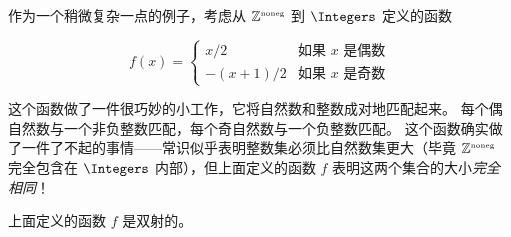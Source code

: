 作为一个稍微复杂一点的例子，考虑从 ${\mathbb Z}^{\mbox{\tiny noneg}}$ 到 $\Integers$ 定义的函数

\[ f(x) = \left\{ \begin{array}{cl} x/2 & \mbox{如果 $x$ 是偶数} \\ -(x+1)/2 & \mbox{如果 $x$ 是奇数} \end{array} \right. \]

这个函数做了一件很巧妙的小工作，它将自然数和整数成对地匹配起来。
每个偶自然数与一个非负整数匹配，每个奇自然数与一个负整数匹配。
这个函数确实做了一件了不起的事情——常识似乎表明整数集必须比自然数集更大（毕竟 ${\mathbb Z}^{\mbox{\tiny noneg}}$ 完全包含在 $\Integers$ 内部），但上面定义的函数 $f$ 表明这两个集合的大小\emph{完全相同}！

\begin{thm}
上面定义的函数 $f$ 是双射的。
\end{thm}

